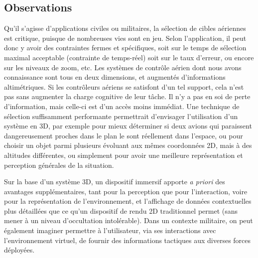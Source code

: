 	\subsection{Observations}
	Qu'il s'agisse d'applications civiles ou militaires, la sélection de cibles aériennes est critique, puisque de nombreuses vies sont en jeu. Selon l'application, il peut donc y avoir des contraintes fermes et spécifiques, soit sur le temps de sélection maximal acceptable (contrainte de temps-réel) soit sur le taux d'erreur, ou encore sur les niveaux de zoom, etc. Les systèmes de contrôle aérien dont nous avons connaissance sont tous en deux dimensions, et augmentés d'informations altimétriques. Si les contrôleurs aériens se satisfont d'un tel support, cela n'est pas sans augmenter la charge cognitive de leur tâche. Il n'y a pas en soi de perte d'information, mais celle-ci est d'un accès moins immédiat. Une technique de sélection suffisamment performante permettrait d'envisager l'utilisation d'un système en 3D, par exemple pour mieux déterminer si deux avions qui paraissent dangereusement proches dans le plan le sont réellement dans l'espace, ou pour choisir un objet parmi plusieurs évoluant aux mêmes coordonnées 2D, mais à des altitudes différentes, ou simplement pour avoir une meilleure représentation et perception générales de la situation.
	
	Sur la base d'un système 3D, un dispositif immersif apporte \emph{a priori} des avantages supplémentaires, tant pour la perception que pour l'interaction, voire pour la représentation de l'environnement, et l'affichage de données contextuelles plus détaillées que ce qu'un dispositif de rendu 2D traditionnel permet (sans mener à un niveau d'occultation intolérable). Dans un contexte militaire, on peut également imaginer permettre à l'utilisateur, via ses interactions avec l'environnement virtuel, de fournir des informations tactiques aux diverses forces déployées.
	
